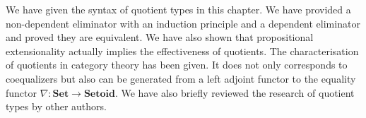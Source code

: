 We have given the syntax of quotient types in this chapter. We have provided a non-dependent eliminator with an induction principle and a dependent eliminator and proved they are equivalent. We have also shown that propositional extensionality actually implies the effectiveness of quotients. The characterisation of quotients in category theory has been given. It does not only corresponds to coequalizers but also can be generated from a left adjoint functor to the equality functor $\nabla : \textbf{Set} \to \textbf{Setoid}$. We have also briefly reviewed the research of quotient types by other authors.







